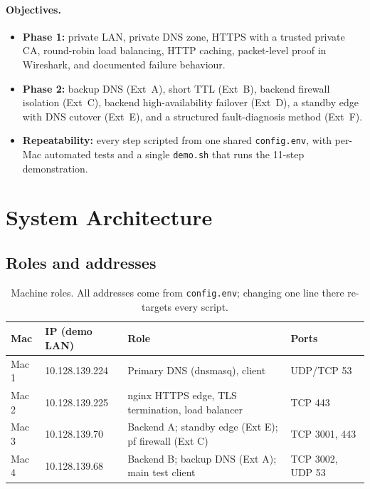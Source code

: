 \documentclass[11pt,a4paper]{article}
\newcommand{\cmd}[1]{\texttt{#1}}
\begin{document}
\paragraph{Objectives.}
\begin{itemize}
  \item \textbf{Phase 1:} private LAN, private DNS zone, HTTPS with a trusted
        private CA, round-robin load balancing, HTTP caching, packet-level
        proof in Wireshark, and documented failure behaviour.
  \item \textbf{Phase 2:} backup DNS (Ext~A), short TTL (Ext~B), backend
        firewall isolation (Ext~C), backend high-availability failover
        (Ext~D), a standby edge with DNS cutover (Ext~E), and a structured
        fault-diagnosis method (Ext~F).
  \item \textbf{Repeatability:} every step scripted from one shared
        \cmd{config.env}, with per-Mac automated tests and a single
        \cmd{demo.sh} that runs the 11-step demonstration.
\end{itemize}

\section{System Architecture}

\subsection{Roles and addresses}

\begin{table}[h]
\centering
\begin{tabularx}{\textwidth}{l l X l}
\toprule
\textbf{Mac} & \textbf{IP (demo LAN)} & \textbf{Role} & \textbf{Ports} \\
\midrule
Mac 1 & 10.128.139.224 & Primary DNS (dnsmasq), client & UDP/TCP 53 \\
Mac 2 & 10.128.139.225 & nginx HTTPS edge, TLS termination, load balancer & TCP 443 \\
Mac 3 & 10.128.139.70  & Backend A; standby edge (Ext E); pf firewall (Ext C) & TCP 3001, 443 \\
Mac 4 & 10.128.139.68  & Backend B; backup DNS (Ext A); main test client & TCP 3002, UDP 53 \\
\bottomrule
\end{tabularx}
\caption{Machine roles. All addresses come from \cmd{config.env}; changing one line there re-targets every script.}
\end{table}
\end{document}
